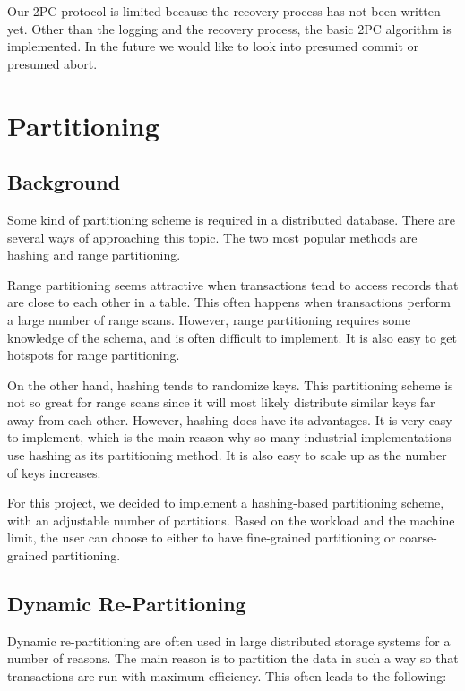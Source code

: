 \documentclass[a4paper, 10pt, notitlepage]{article}
\begin{document}
Our 2PC protocol is limited because the recovery process has not been written yet. Other than the logging and the recovery
process, the basic 2PC algorithm is implemented. In the future we would like to look into presumed commit or presumed abort.

\section{Partitioning}

\subsection{Background}

Some kind of partitioning scheme is required in a distributed database. There are several ways of approaching
this topic. The two most popular methods are hashing and range partitioning.

Range partitioning seems attractive when transactions tend to access records that are close to each other
in a table. This often happens when transactions perform a large number of range scans. However, range partitioning
requires some knowledge of the schema, and is often difficult to implement. It is also easy to get hotspots for
range partitioning.

On the other hand, hashing tends to randomize keys. This partitioning scheme is not so great for range scans
since it will most likely distribute similar keys far away from each other. However, hashing does have its advantages.
It is very easy to implement, which is the main reason why so many industrial implementations use hashing as its
partitioning method. It is also easy to scale up as the number of keys increases. 

For this project, we decided to implement a hashing-based partitioning scheme, with an adjustable number of partitions.
Based on the workload and the machine limit, the user can choose to either to have fine-grained partitioning or
coarse-grained partitioning.

\subsection{Dynamic Re-Partitioning}

Dynamic re-partitioning are often used in large distributed storage systems for a number of reasons. The main reason is
to partition the data in such a way so that transactions are run with maximum efficiency. This often leads to the following:
\end{document}
